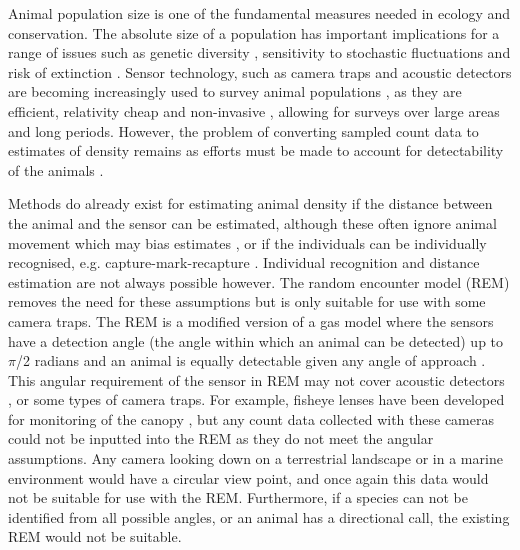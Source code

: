 Animal population size is one of the fundamental measures needed in ecology and conservation. The absolute size of a population has important implications for a range of issues such as genetic diversity \citep{o1985genetic, fischer2000genetic, willi2005threefold}, sensitivity to stochastic fluctuations \citep{richter1972extinction,wright1983stochastic} and risk of extinction \citep{purvis2000predicting}. Sensor technology, such as camera traps \citep{rowcliffe2008surveys,ahumada2011community} and acoustic detectors \citep{ofarrel1999comparison,mellinger2007fixed,walters2012continental} are becoming increasingly used to survey animal populations \citep{rowcliffe2008surveys, kessel2014review}, as they are efficient, relativity cheap and non-invasive \citep{gese2001monitoring, o2003crouching, silveira2003camera}, allowing for surveys over large areas and long periods. However, the problem of converting sampled count data to estimates of density remains as efforts must be made to account for detectability of the animals \citep{dail2011models, chandler2011inference, solymos2013calibrating}.


Methods do already exist for estimating animal density if the distance between the animal and the sensor can be estimated, although these often ignore animal movement which may bias estimates \citep{barlow2005estimates, marques2011estimating}, or if the individuals can be individually recognised, e.g. capture-mark-recapture \citep{karanth1995, trolle2003estimation, soisalo2006estimating, trolle2007camera}. Individual recognition and distance estimation are not always possible however. The random encounter model (REM) removes the need for these assumptions but is only suitable for use with some camera traps. The REM is a modified version of a gas model where the sensors have a detection angle (the angle within which an animal can be detected) up to $\pi$/2 radians and an animal is equally detectable given any angle of approach \citep{rowcliffe2008estimating}. This angular requirement of the sensor in REM may not cover acoustic detectors \citep{adams2012you}, or some types of camera traps. For example, fisheye lenses have been developed for monitoring of the canopy \citep{brusa2014increasing}, but any count data collected with these cameras could not be inputted into the REM as they do not meet the angular assumptions. Any camera looking down on a terrestrial landscape or in a marine environment would have a circular view point, and once again this data would not be suitable for use with the REM. Furthermore, if a species can not be identified from all possible angles, or an animal has a directional call, the existing REM would not be suitable.

